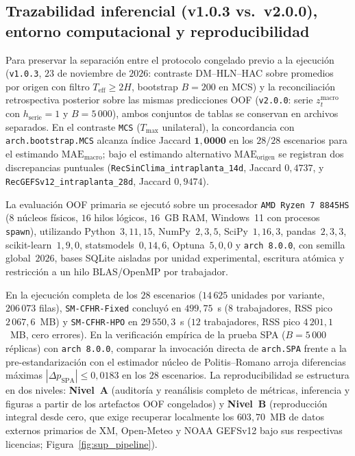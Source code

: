 \documentclass[11pt,a4paper]{article}
\begin{document}
\subsection{Trazabilidad inferencial (v1.0.3 vs.\ v2.0.0), entorno computacional y reproducibilidad}\label{sup:env}

Para preservar la separación entre el protocolo congelado previo a la ejecución (\texttt{v1.0.3}, $23$ de noviembre de $2026$: contraste DM--HLN--HAC sobre promedios por origen con filtro $T_{\mathrm{eff}} \ge 2H$, bootstrap $B=200$ en MCS) y la reconciliación retrospectiva posterior sobre las mismas predicciones OOF (\texttt{v2.0.0}: serie $z_t^{\mathrm{macro}}$ con $h_{\mathrm{serie}}=1$ y $B=5\,000$), ambos conjuntos de tablas se conservan en archivos separados. En el contraste \texttt{MCS} ($T_{\max}$ unilateral), la concordancia con \texttt{arch.bootstrap.MCS} alcanza índice Jaccard $\mathbf{1{,}0000}$ en los $28/28$ escenarios para el estimando $\mathrm{MAE}_{\mathrm{macro}}$; bajo el estimando alternativo $\mathrm{MAE}_{\mathrm{origen}}$ se registran dos discrepancias puntuales (\texttt{RecSinClima\_intraplanta\_14d}, Jaccard $0{,}4737$, y \texttt{RecGEFSv12\_intraplanta\_28d}, Jaccard $0{,}9474$).

La evaluación OOF primaria se ejecutó sobre un procesador \texttt{AMD Ryzen 7 8845HS} ($8$ núcleos físicos, $16$ hilos lógicos, $16$~GB RAM, Windows~11 con procesos \texttt{spawn}), utilizando Python~$3{,}11{,}15$, NumPy~$2{,}3{,}5$, SciPy~$1{,}16{,}3$, pandas~$2{,}3{,}3$, scikit-learn~$1{,}9{,}0$, statsmodels~$0{,}14{,}6$, Optuna~$5{,}0{,}0$ y \texttt{arch 8.0.0}, con semilla global~$2026$, bases SQLite aisladas por unidad experimental, escritura atómica y restricción a un hilo BLAS/OpenMP por trabajador.

En la ejecución completa de los $28$ escenarios ($14\,625$ unidades por variante, $206\,073$ filas), \texttt{SM-CFHR-Fixed} concluyó en $499{,}75$~s ($8$ trabajadores, RSS pico $2\,067{,}6$~MB) y \texttt{SM-CFHR-HPO} en $29\,550{,}3$~s ($12$ trabajadores, RSS pico $4\,201{,}1$~MB, cero errores). En la verificación empírica de la prueba SPA ($B=5\,000$ réplicas) con \texttt{arch 8.0.0}, comparar la invocación directa de \texttt{arch.SPA} frente a la pre-estandarización con el estimador núcleo de Politis--Romano arroja diferencias máximas $|\Delta p_{\mathrm{SPA}}| \le 0{,}0183$ en los $28$ escenarios. La reproducibilidad se estructura en dos niveles: \textbf{Nivel~A} (auditoría y reanálisis completo de métricas, inferencia y figuras a partir de los artefactos OOF congelados) y \textbf{Nivel~B} (reproducción integral desde cero, que exige recuperar localmente los $603{,}70$~MB de datos externos primarios de XM, Open-Meteo y NOAA GEFSv12 bajo sus respectivas licencias; Figura~\ref{fig:sup_pipeline}).
\end{document}
